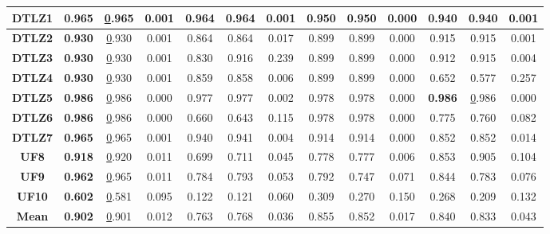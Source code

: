 \begin{table*}[t]
\begin{tabular}{cc|c|c|c|c|c|c|c|c|c|c|c}
\multicolumn{1}{c|}{\textbf{DTLZ1}} & \textbf{0.965} & {\ul 0.965} & 0.001 & 0.964 & 0.964 & 0.001 & 0.950 & 0.950 & 0.000 & 0.940 & 0.940 & 0.001 \\ \hline
\multicolumn{1}{c|}{\textbf{DTLZ2}} & \textbf{0.930} & {\ul 0.930} & 0.001 & 0.864 & 0.864 & 0.017 & 0.899 & 0.899 & 0.000 & 0.915 & 0.915 & 0.001 \\ \hline
\multicolumn{1}{c|}{\textbf{DTLZ3}} & \textbf{0.930} & {\ul 0.930} & 0.001 & 0.830 & 0.916 & 0.239 & 0.899 & 0.899 & 0.000 & 0.912 & 0.915 & 0.004 \\ \hline
\multicolumn{1}{c|}{\textbf{DTLZ4}} & \textbf{0.930} & {\ul 0.930} & 0.001 & 0.859 & 0.858 & 0.006 & 0.899 & 0.899 & 0.000 & 0.652 & 0.577 & 0.257 \\ \hline
\multicolumn{1}{c|}{\textbf{DTLZ5}} & \textbf{0.986} & {\ul 0.986} & 0.000 & 0.977 & 0.977 & 0.002 & 0.978 & 0.978 & 0.000 & \textbf{0.986} & {\ul 0.986} & 0.000 \\ \hline
\multicolumn{1}{c|}{\textbf{DTLZ6}} & \textbf{0.986} & {\ul 0.986} & 0.000 & 0.660 & 0.643 & 0.115 & 0.978 & 0.978 & 0.000 & 0.775 & 0.760 & 0.082 \\ \hline
\multicolumn{1}{c|}{\textbf{DTLZ7}} & \textbf{0.965} & {\ul 0.965} & 0.001 & 0.940 & 0.941 & 0.004 & 0.914 & 0.914 & 0.000 & 0.852 & 0.852 & 0.014 \\ \hline
\multicolumn{1}{c|}{\textbf{UF8}} & \textbf{0.918} & {\ul 0.920} & 0.011 & 0.699 & 0.711 & 0.045 & 0.778 & 0.777 & 0.006 & 0.853 & 0.905 & 0.104 \\ \hline
\multicolumn{1}{c|}{\textbf{UF9}} & \textbf{0.962} & {\ul 0.965} & 0.011 & 0.784 & 0.793 & 0.053 & 0.792 & 0.747 & 0.071 & 0.844 & 0.783 & 0.076 \\ \hline
\multicolumn{1}{c|}{\textbf{UF10}} & \textbf{0.602} & {\ul 0.581} & 0.095 & 0.122 & 0.121 & 0.060 & 0.309 & 0.270 & 0.150 & 0.268 & 0.209 & 0.132 \\ \hline
\multicolumn{1}{c|}{\textbf{Mean}} & \textbf{0.902} & {\ul 0.901} & 0.012 & 0.763 & 0.768 & 0.036 & 0.855 & 0.852 & 0.017 & 0.840 & 0.833 & 0.043 \\ \hline
\end{tabular}%
\end{table*}
